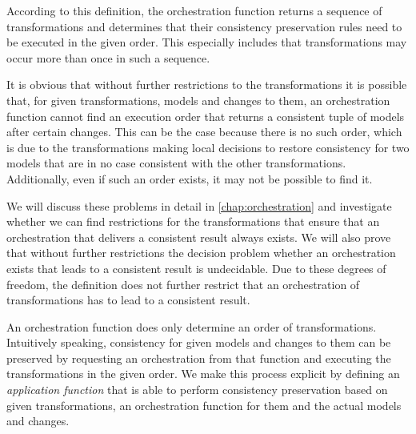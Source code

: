 According to this definition, the orchestration function returns a sequence of transformations and determines that their consistency preservation rules need to be executed in the given order. 
This especially includes that transformations may occur more than once in such a sequence.

It is obvious that without further restrictions to the transformations it is possible that, for given transformations, models and changes to them, an orchestration function cannot find an execution order that returns a consistent tuple of models after certain changes.
This can be the case because there is no such order, which is due to the transformations making local decisions to restore consistency for two models that are in no case consistent with the other transformations.
Additionally, even if such an order exists, it may not be possible to find it.



We will discuss these problems in detail in \autoref{chap:orchestration} and investigate whether we can find restrictions for the transformations that ensure that an orchestration that delivers a consistent result always exists.
We will also prove that without further restrictions the decision problem whether an orchestration exists that leads to a consistent result is undecidable.
Due to these degrees of freedom, the definition does not further restrict that an orchestration of transformations has to lead to a consistent result.

An orchestration function does only determine an order of transformations.
Intuitively speaking, consistency for given models and changes to them can be preserved by requesting an orchestration from that function and executing the transformations in the given order.
We make this process explicit by defining an \emph{application function} that is able to perform consistency preservation based on given transformations, an orchestration function for them and the actual models and changes.

